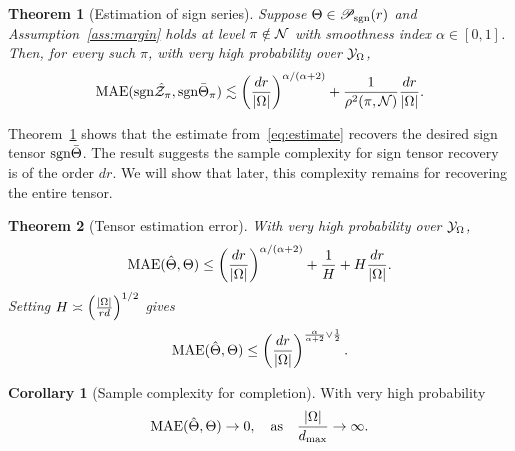 \documentclass{article}
\theoremstyle{plain}
\newtheorem{thm}{Theorem}[section]
\theoremstyle{definition}
\newtheorem{assumption}{Assumption}
\newtheorem{cor}{Corollary}
\def\sign{\textup{sgn}}
\def\caliP{\mathscr{P}_{\textup{sgn}}}
\def\risk{\textup{Risk}}
\begin{document}
\begin{thm}[Estimation of sign series]\label{thm:classification} Suppose $\Theta\in\caliP(r)$ and Assumption~\ref{ass:margin} holds at level $\pi\notin \mathcal{N}$ with smoothness index $\alpha\in[0,1]$. Then, for every such $\pi$, with very high probability over $\mathcal{Y}_\Omega$, 
\[
\textup{MAE}(\sign \hat \tZ_\pi, \sign \bar \Theta_\pi) \lesssim \left({d r \over |\Omega|}\right)^{\alpha/(\alpha+2)}+{1\over \rho^2(\pi, \tN)} {dr \over |\Omega|}.
\]
\end{thm}
Theorem~\ref{thm:classification} shows that the estimate from~\eqref{eq:estimate} recovers the desired sign tensor $\sign \bar \Theta$. 
The result suggests the sample complexity for sign tensor recovery is of the order $dr$. We will show that later, this complexity remains for recovering the entire tensor. 
\begin{thm}[Tensor estimation error] With very high probability over $\mathcal{Y}_\Omega$,
\[
\textup{MAE}(\hat \Theta, \Theta)\leq \left({d r \over |\Omega|}\right)^{\alpha/(\alpha+2)}+{1\over H}+H{d r \over |\Omega|}.
\]
Setting $H\asymp \left( |\Omega|\over rd\right)^{1/2}$ gives
\[
\textup{MAE}(\hat \Theta, \Theta)\leq \left(dr \over|\Omega|\right)^{{\alpha \over \alpha+2} \vee {1\over 2}}.
\]
\end{thm}

\begin{cor}[Sample complexity for completion] With very high probability 
\[
\textup{MAE}(\hat \Theta, \Theta)\to 0, \quad \text{as}\quad {|\Omega|\over d_{\max}}\to \infty.
\]
\end{cor}
\end{document}
